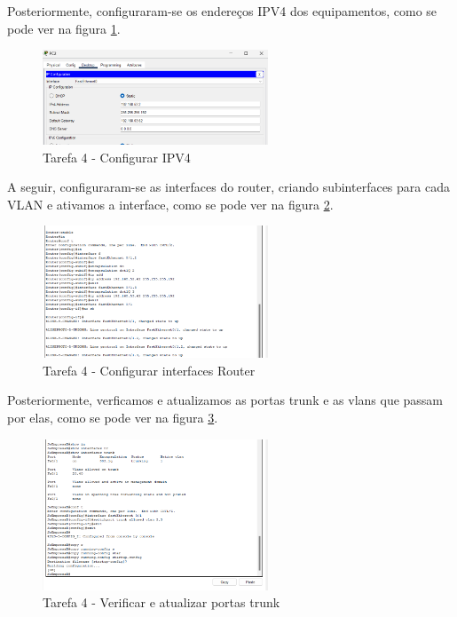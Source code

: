 \documentclass[11pt,english, openright, oneside]{book}
\begin{document}
Posteriormente, configuraram-se os endereços IPV4 dos equipamentos, como se pode
ver na figura \ref{fig:4.1.4}.

\begin{figure}[H]
    \centering
    \includegraphics[width=0.6\textwidth]{imagens/Tarefa4/4.1.4.png}
    \caption{Tarefa 4 - Configurar IPV4}
    \label{fig:4.1.4}
\end{figure}
\vspace{0.2cm}

A seguir, configuraram-se as interfaces do router, criando subinterfaces para
cada VLAN e ativamos a interface, como se pode ver na figura \ref{fig:4.1.5}.

\begin{figure}[H]
    \centering
    \includegraphics[width=0.6\textwidth]{imagens/Tarefa4/4.1.5.png}
    \caption{Tarefa 4 - Configurar interfaces Router}
    \label{fig:4.1.5}
\end{figure}
\vspace{0.2cm}

Posteriormente, verficamos e atualizamos as portas trunk e as vlans que passam
por elas, como se pode ver na figura \ref{fig:4.1.6}.

\begin{figure}[H]
    \centering
    \includegraphics[width=0.6\textwidth]{imagens/Tarefa4/4.1.6.png}
    \caption{Tarefa 4 - Verificar e atualizar portas trunk}
    \label{fig:4.1.6}
\end{figure}
\vspace{0.2cm}
\end{document}
